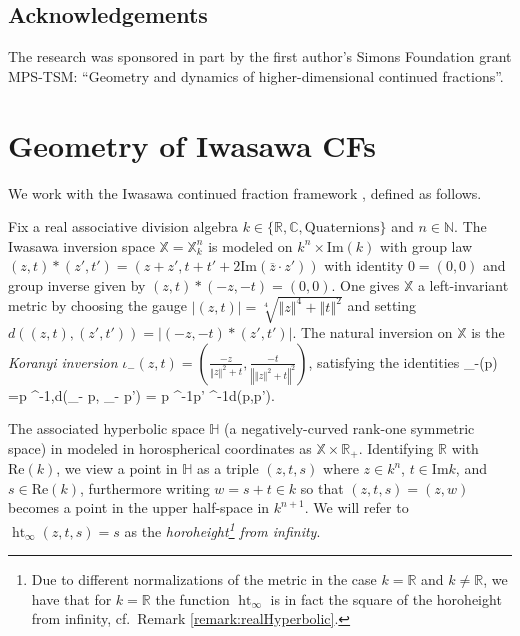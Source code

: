\documentclass[reqno,10pt]{amsart}
\let\oldequation\equation
\let\oldendequation\endequation
\renewenvironment{equation}
  {\linenomathNonumbers\oldequation}
  {\oldendequation\endlinenomath}
\renewcommand{\C}{\mathbb{C}}
\newcommand{\Hyp}{\mathbb{H}}
\newcommand{\R}{\mathbb{R}}
\newcommand{\X}{\mathbb X}
\newcommand{\norm}[1]{\left\vert #1 \right \vert}
\newcommand{\Norm}[1]{\left\Vert #1 \right \Vert}
\renewcommand{\Re}{\text{Re}}
\renewcommand{\Im}{\text{Im}}
\numberwithin{thm}{section}
\theoremstyle{definition}
\theoremstyle{definition}
\numberwithin{equation}{section}
\begin{document}
\subsection{Acknowledgements}
The research was sponsored in part by the first author's Simons Foundation grant MPS-TSM: ``Geometry and dynamics of higher-dimensional continued fractions''.



\section{Geometry of Iwasawa CFs}\label{sec:background}
\label{sec:Iwasawa}

We work with the Iwasawa continued fraction framework \cite{lukyanenko_vandehey_2022}, defined as follows. 

Fix a real associative division algebra $k\in \{\R, \C, \text{Quaternions}\}$ and $n\in \mathbb N$. The Iwasawa inversion space $\X=\X^n_k$ is modeled on $k^{n}\times \Im(k)$ with group law $(z,t)*(z',t') = (z+z', t+t'+2\Im (\overline z\cdot z'))$ with identity $0=(0,0)$ and group inverse given by $(z,t)*(-z,-t)=(0,0)$. One gives $\X$ a left-invariant metric by choosing the gauge $\norm{(z,t)} = \sqrt[4]{\Norm{z}^4 + \Norm{t}^2}$ and setting $d((z,t),(z',t')) = \norm{(-z,-t)*(z',t')}$. The natural inversion on $\X$ is the \emph{Koranyi inversion}
$\iota_-(z,t)=\left(\frac{-z}{\Norm{z}^2+t},\frac{-t}{\Norm{\Norm{z}^2+t}^2}\right)$,
satisfying the identities
\begin{equation}\label{eq:magicinversion}\norm{\iota_-(p)}=\norm{p}^{-1},\hspace{1in}d(\iota_- p, \iota_- p') = \norm{p}^{-1}\norm{p'}^{-1}d(p,p').\end{equation}

The associated hyperbolic space $\Hyp$ (a negatively-curved rank-one symmetric space) in modeled in horospherical coordinates as $\X\times \R_+$. Identifying $\R$ with $\Re(k)$, we view a point in $\Hyp$ as a triple $(z,t,s)$ where $z\in k^n$, $t\in \Im k$, and $s\in \Re(k)$, furthermore writing $w=s+t\in k$ so that $(z,t,s)=(z,w)$ becomes a point in the upper half-space in $k^{n+1}$. We will refer to $\operatorname{ht}_\infty(z,t,s)=s$ as the \emph{horoheight\footnote{Due to different normalizations of the metric in the case $k=\R$ and $k\neq \R$, we have that for $k=\R$ the function $\operatorname{ht}_\infty$ is in fact the square of the horoheight from infinity, cf.~Remark \ref{remark:realHyperbolic}.} from infinity}. 
\end{document}

